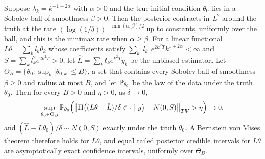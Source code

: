 \begin{theorem}
\label{thm:heat_rates}
Suppose $\lambda_k = k^{-1-2\alpha}$ with $\alpha>0$ and the true initial condition $\theta_0$ lies in a Sobolev ball of smoothness $\beta>0$. Then the posterior contracts in $L^2$ around the truth at the rate $(\log(1/\delta))^{-\min(\alpha,\beta)/2}$ up to constants, uniformly over the ball, and this is the minimax rate when $\alpha\geq\beta$. For a linear functional $L\theta = \sum_kl_k\theta_k$ whose coefficients satisfy $\sum_k|l_k|\,e^{2k^2T}k^{1+2\alpha}<\infty$ and $S = \sum_kl_k^2e^{2k^2T}>0$, let $\hat L = \sum_kl_ke^{k^2T}y_k$ be the unbiased estimator. Let $\Theta_B = \{\theta_0:\sup_k|\theta_{0,k}|\leq B\}$, a set that contains every Sobolev ball of smoothness $\beta\geq0$ and radius at most $B$, and let $\P_{\theta_0}$ be the law of the data under the truth $\theta_0$. Then for every $B>0$ and $\eta>0$, as $\delta\to0$,
\[
\sup_{\theta_0\in\Theta_B}\P_{\theta_0}\Big(\big\|\Pi\big((L\theta-\hat L)/\delta\in\cdot\mid y\big)-N(0,S)\big\|_{TV}>\eta\Big)\to0,
\]
and $(\hat L-L\theta_0)/\delta\sim N(0,S)$ exactly under the truth $\theta_0$. A Bernstein von Mises theorem therefore holds for $L\theta$, and equal tailed posterior credible intervals for $L\theta$ are asymptotically exact confidence intervals, uniformly over $\Theta_B$.
\end{theorem}


